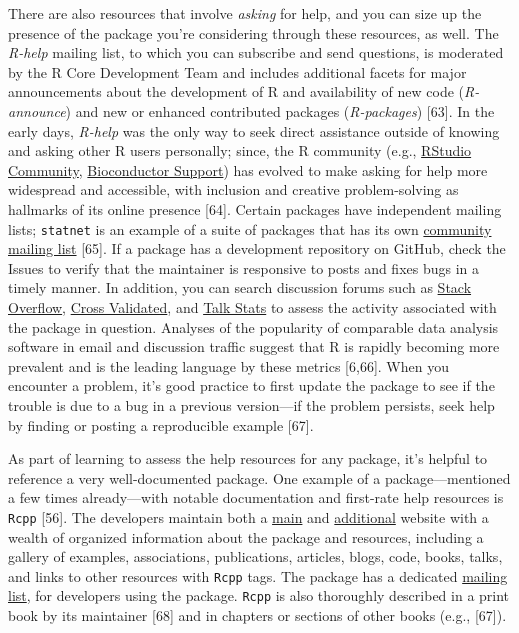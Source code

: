 \documentclass[10pt,letterpaper]{article}
\begin{document}
There are also resources that involve \emph{asking} for help, and you
can size up the presence of the package you're considering through these
resources, as well. The \emph{R-help} mailing list, to which you can
subscribe and send questions, is moderated by the R Core Development
Team and includes additional facets for major announcements about the
development of R and availability of new code (\emph{R-announce}) and
new or enhanced contributed packages (\emph{R-packages}) {[}63{]}. In
the early days, \emph{R-help} was the only way to seek direct assistance
outside of knowing and asking other R users personally; since, the R
community (e.g., \href{https://community.rstudio.com/}{RStudio
Community}, \href{https://support.bioconductor.org/}{Bioconductor
Support}) has evolved to make asking for help more widespread and
accessible, with inclusion and creative problem-solving as hallmarks of
its online presence {[}64{]}. Certain packages have independent mailing
lists; \texttt{statnet} is an example of a suite of packages that has
its own \href{http://statnet.org/}{community mailing list} {[}65{]}. If
a package has a development repository on GitHub, check the Issues to
verify that the maintainer is responsive to posts and fixes bugs in a
timely manner. In addition, you can search discussion forums such as
\href{https://stackoverflow.com/}{Stack Overflow},
\href{https://stats.stackexchange.com/}{Cross Validated}, and
\href{http://www.talkstats.com/}{Talk Stats} to assess the activity
associated with the package in question. Analyses of the popularity of
comparable data analysis software in email and discussion traffic
suggest that R is rapidly becoming more prevalent and is the leading
language by these metrics {[}6,66{]}. When you encounter a problem, it's
good practice to first update the package to see if the trouble is due
to a bug in a previous version---if the problem persists, seek help by
finding or posting a reproducible example {[}67{]}.

As part of learning to assess the help resources for any package, it's
helpful to reference a very well-documented package. One example of a
package---mentioned a few times already---with notable documentation and
first-rate help resources is \texttt{Rcpp} {[}56{]}. The developers
maintain both a \href{http://www.rcpp.org/}{main} and
\href{http://dirk.eddelbuettel.com/code/rcpp.html}{additional} website
with a wealth of organized information about the package and resources,
including a gallery of examples, associations, publications, articles,
blogs, code, books, talks, and links to other resources with
\texttt{Rcpp} tags. The package has a dedicated
\href{https://lists.r-forge.r-project.org/cgi-bin/mailman/listinfo/rcpp-devel}{mailing
list}, for developers using the package. \texttt{Rcpp} is also
thoroughly described in a print book by its maintainer {[}68{]} and in
chapters or sections of other books (e.g., {[}67{]}).
\end{document}
